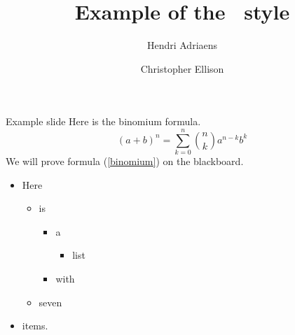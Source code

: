 \documentclass[paper=letterpaper,style=\style]{powerdot}
\title{Example of the \style\ style}
\author{Hendri Adriaens \and Christopher Ellison}
\begin{document}
\maketitle
\begin{slide}{Example slide}
  Here is the binomium formula.
  \begin{equation}\label{binomium}
    (a+b)^n=\sum_{k=0}^n{n\choose k}a^{n-k}b^k
  \end{equation}
  We will prove formula (\ref{binomium}) on the blackboard.\\
  \begin{itemize}
    \item Here
    \begin{itemize}
      \item is
      \begin{itemize}
        \item a
        \begin{itemize}
          \item list
        \end{itemize}
        \item with
      \end{itemize}
      \item seven
    \end{itemize}
    \item items.
  \end{itemize}
\end{slide}
\end{document}
